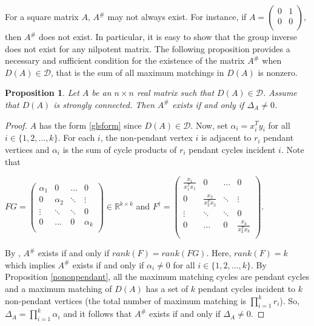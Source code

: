 \documentclass[notitlepage,12pt,reqno]{amsart}
\newtheorem{prop}[thm]{Proposition}
\numberwithin{equation}{section}
\begin{document}
For a square matrix $A$, $A^{\#}$ may not always exist. For instance, if $A=\begin{pmatrix}
0 & 1  \\
0 & 0 \\
\end{pmatrix},$ then $A^{\#}$ does not exist. In particular, it is easy to show that the group inverse does not exist for any nilpotent matrix. The following proposition provides a necessary and sufficient condition for the existence of the matrix $A^{\#}$ when $D(A)\in \mathcal{D}$, that is the sum of all maximum matchings in $D(A)$ is nonzero.
\begin{prop}
Let $A$ be an $n\times n$ real matrix such that $D(A)\in \mathcal{D}$. Assume that $D(A)$ is strongly connected. Then $A^{\#}$ exists if  and only if $\Delta _A\neq 0$.
\end{prop}
\begin{proof}
$A$ has the form \ref{glsform} since $D(A)\in \mathcal{D}$. Now, set $\alpha _i=x_i^Ty_i$ for all $i\in \{1,2,\ldots ,k\}$. For each $i$, the non-pendant vertex $i$ is adjacent to $r_i$ pendant vertices and $\alpha _i$ is the sum of cycle products of $r_i$ pendant cycles incident $i$. Note that
\begin{center}
$FG=\begin{pmatrix}
\alpha _1 & 0 & \hdots & 0 \\
0 &\alpha _2 & \ddots & \vdots \\
\vdots & \ddots & \ddots & 0 \\
0 & \hdots & 0 & \alpha _k \\
\end{pmatrix}\in \mathbb{R}^{k\times k}$ and $F^{\dagger}=\begin{pmatrix}
\frac{x_1}{x_1^Tx_1} & 0 & \hdots & 0 \\
0 & \frac{x_2}{x_2^Tx_2} & \ddots & \vdots \\
\vdots & \ddots & \ddots & 0 \\
0 & \hdots & 0 & \frac{x_k}{x_k^Tx_k} \\
\end{pmatrix}$.
\end{center}
By \cite[Theorem 3.1]{lw}, $A^{\#}$ exists if and only if $rank(F)=rank(FG)$. Here, $rank(F)=k$ which implies $A^{\#}$ exists if and only if $\alpha _i\neq 0$ for all $i\in \{1,2,\ldots ,k\}$. By Proposition \ref{nononpendant}, all the maximum matching cycles are pendant cycles and a maximum matching of $D(A)$ has a set of $k$ pendant cycles incident to $k$ non-pendant vertices (the total number of maximum matching is $\prod _{i=1}^kr _i$). So, $\Delta _A=\prod _{i=1}^k\alpha _i$ and it follows that $A^{\#}$ exists if and only if $\Delta _A\neq 0$.
\end{proof}
\end{document}
